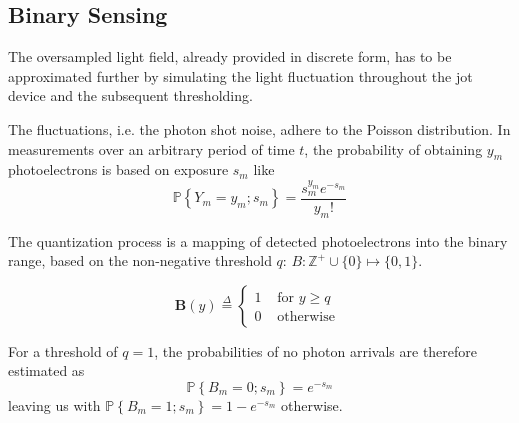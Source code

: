 \subsection{Binary Sensing}

The oversampled light field, already provided in discrete form, has to be approximated further by simulating the light fluctuation throughout the jot device and the subsequent thresholding. 

The fluctuations, i.e. the photon shot noise, adhere to the Poisson distribution. In measurements over an arbitrary period of time $t$, the probability of obtaining $y_{m}$ photoelectrons is based on exposure $s_{m}$ like
\begin{equation}\mathbb{P}\left\{Y_{m}=y_{m} ; s_{m}\right\}=\frac{s_{m}^{y_{m}} e^{-s_{m}}}{y_{m} !}\end{equation}

The quantization process is a mapping of detected photoelectrons into the binary range, based on the non-negative threshold $q$: $B: \mathbb{Z}^{+} \cup\{0\} \longmapsto\{0,1\}$.

\begin{equation}\boldsymbol{B}(y) \stackrel{ \Delta }{=}\left\{\begin{array}{ll}1 & \text { for } y \geq q \\ 0 & \text { otherwise }\end{array}\right.\end{equation}

For a threshold of $q = 1$, the probabilities of no photon arrivals are therefore estimated as 
\begin{equation}\label{eq:poisson0}\quad \mathbb{P}\left\{B_{m}=0 ; s_{m}\right\}=e^{-s_{m}} \quad\end{equation}leaving us with $\mathbb{P}\left\{B_{m}=1 ; s_{m}\right\}=1-e^{-s_{m}}$ otherwise.


